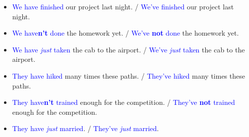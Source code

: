 \begin{multicols}{2}
\begin{itemize}
\item \textcolor{blue}{We have finished} our project last night. / \textcolor{blue}{We've finished} our project last night.
\item \textcolor{blue}{We have\textbf{n't} done} the homework yet. / \textcolor{blue}{We've \textbf{not} done} the homework yet.
\item \textcolor{blue}{We have \emph{just} taken} the cab to the airport. / \textcolor{blue}{We've \emph{just} taken} the cab to the airport.

\item \textcolor{blue}{They have hiked} many times these paths. / \textcolor{blue}{They've hiked} many times these paths.
\item \textcolor{blue}{They have\textbf{n't} trained} enough for the competition. / \textcolor{blue}{They've \textbf{not} trained} enough for the competition.
\item \textcolor{blue}{They have \emph{just} married}. / \textcolor{blue}{They've \emph{just} married}.

\end{itemize}
\end{multicols}

